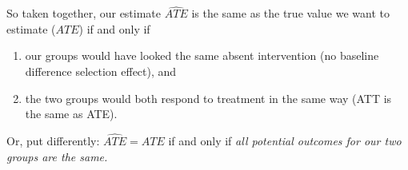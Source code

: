 \documentclass[11pt]{article}
\begin{document}
So taken together, our estimate $\widehat{ATE}$ is the same as the true value we want to estimate ($ATE$) if and only if
\begin{enumerate}
  \item our groups would have looked the same absent intervention (no baseline difference selection effect), and
  \item the two groups would both respond to treatment in the same way (ATT is the same as ATE).
\end{enumerate}

Or, put differently: $\widehat{ATE} = ATE$ if and only if \emph{all potential outcomes for our two groups are the same.}
\end{document}
